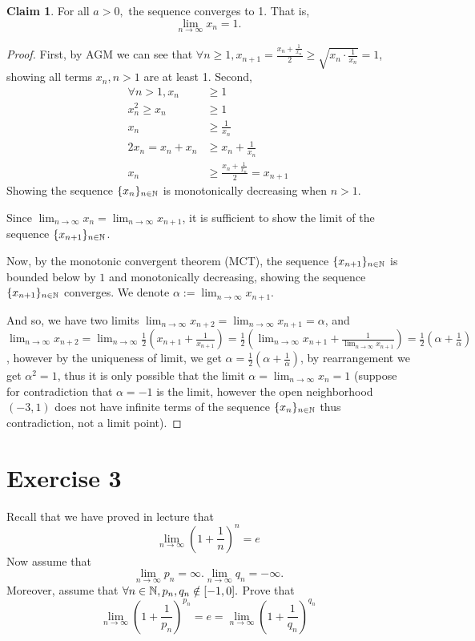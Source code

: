 \documentclass{homework}
\newcommand{\N}{\bb{N}} %
\newcommand{\ra}{\rightarrow}
\newcommand{\?}{\stackrel{?}{=}}
\theoremstyle{definition}
\newtheorem*{claim}{Claim}
\begin{document}
\begin{claim}
    For all $a>0,$ the sequence converges to 1. That is, \[\lim_{n\ra\infty}x_n=1.\]
\end{claim}
\begin{proof}
    First, by AGM we can see that $\forall n\geq1, x_{n+1}=\frac{x_n+\frac{1}{x_n}}{2}\geq\sqrt{x_n\cdot \frac{1}{x_n}}=1$, showing all terms $x_n, n>1$ are at least 1. Second, \begin{align*}
        \forall n>1, x_n&\geq 1\\
        x_n^2\geq x_n&\geq 1\\
        x_n&\geq\frac{1}{x_n}\\
        2x_n=x_n+x_n&\geq x_n + \frac{1}{x_n}\\
        x_n&\geq\frac{x_n+\frac{1}{x_n}}{2}=x_{n+1}
    \end{align*}
Showing the sequence $\{x_n\}_{n\in\N}$ is monotonically decreasing when $n>1$. 

Since $\lim_{n\ra\infty}x_n=\lim_{n\ra\infty}x_{n+1}$, it is sufficient to show the limit of the sequence $\{x_{n+1}\}_{n\in\N}$. 

Now, by the monotonic convergent theorem (MCT), the sequence $\{x_{n+1}\}_{n\in\N}$ is bounded below by $1$ and monotonically decreasing, showing the sequence $\{x_{n+1}\}_{n\in\N}$ converges. We denote  $\alpha:=\lim_{n\ra\infty}x_{n+1}$. 

And so, we have two limits $\lim_{n\ra\infty}x_{n+2}=\lim_{n\ra\infty}x_{n+1}=\alpha$, and $\lim_{n\ra\infty}x_{n+2}=\lim_{n\ra\infty}\frac12(x_{n+1}+\frac{1}{x_{n+1}})=\frac12(\lim_{n\ra\infty}x_{n+1}+\frac{1}{\lim_{n\ra\infty}x_{n+1}})=\frac12(\alpha+\frac{1}{\alpha})$, however by the uniqueness of limit, we get $\alpha=\frac{1}{2}(\alpha+\frac{1}{\alpha})$, by rearrangement we get $\alpha^2=1$, thus it is only possible that the limit $\alpha=\lim_{n\ra\infty}x_n=1$ (suppose for contradiction that $\alpha=-1$ is the limit, however the open neighborhood $(-3, 1)$ does not have infinite terms of the sequence $\{x_n\}_{n\in\N}$ thus contradiction, not a limit point).   
\end{proof}


\newpage
\section*{Exercise 3}

Recall that we have proved in lecture that $$\lim_{n\ra\infty}(1+\frac1n)^n=e$$ Now assume that $$\lim_{n\ra\infty}p_n=\infty. \lim_{n\ra\infty}q_n=-\infty.$$ Moreover, assume that $\forall n\in\N, p_n,q_n\notin[-1,0]. $ Prove that $$\lim_{n\ra\infty}(1+\frac1{p_n})^{p_n}=e=\lim_{n\ra\infty}(1+\frac1{q_n})^{q_n}$$
\end{document}
